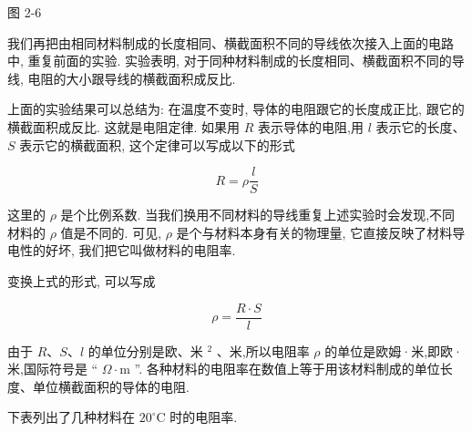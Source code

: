 \documentclass[10pt]{article}
\begin{document}
图 2-6

我们再把由相同材料制成的长度相同、横截面积不同的导线依次接入上面的电路中, 重复前面的实验. 实验表明, 对于同种材料制成的长度相同、横截面积不同的导线, 电阻的大小跟导线的横截面积成反比.

上面的实验结果可以总结为: 在温度不变时, 导体的电阻跟它的长度成正比, 跟它的横截面积成反比. 这就是电阻定律. 如果用 \(R\) 表示导体的电阻,用 \(l\) 表示它的长度、 \(S\) 表示它的横截面积, 这个定律可以写成以下的形式

\[
R = \rho \frac{l}{S}
\]

这里的 \(\rho\) 是个比例系数. 当我们换用不同材料的导线重复上述实验时会发现,不同材料的 \(\rho\) 值是不同的. 可见, \(\rho\) 是个与材料本身有关的物理量, 它直接反映了材料导电性的好坏, 我们把它叫做材料的电阻率.

变换上式的形式, 可以写成

\[
\rho = \frac{R \cdot S}{l}
\]

由于 \(R\text{、}S\text{、}l\) 的单位分别是欧、米 \({}^{2}\) 、米,所以电阻率 \(\rho\) 的单位是欧姆·米,即欧·米,国际符号是 “ \(\Omega \cdot \mathrm{m}\) ”. 各种材料的电阻率在数值上等于用该材料制成的单位长度、单位横截面积的导体的电阻.

下表列出了几种材料在 \({20}^{ \circ }\mathrm{C}\) 时的电阻率.

\begin{center}
\end{center}
\end{document}
